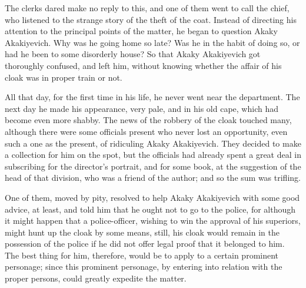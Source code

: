 The clerks dared make no reply to this, and one of them went to call
the chief, who listened to the strange story of the theft of the coat.
Instead of directing his attention to the principal points of the
matter, he began to question Akaky Akakiyevich. Why was he going home
so late? Was he in the habit of doing so, or had he been to some
disorderly house? So that Akaky Akakiyevich got thoroughly confused,
and left him, without knowing whether the affair of his cloak was in
proper train or not.

All that day, for the first time in his life, he never went near the
department. The next day he made his appearance, very pale, and in his
old cape, which had become even more shabby. The news of the robbery
of the cloak touched many, although there were some officials present
who never lost an opportunity, even such a one as the present, of
ridiculing Akaky Akakiyevich. They decided to make a collection for
him on the spot, but the officials had already spent a great deal in
subscribing for the director's portrait, and for some book, at the
suggestion of the head of that division, who was a friend of the
author; and so the sum was trifling.

One of them, moved by pity, resolved to help Akaky Akakiyevich with
some good advice, at least, and told him that he ought not to go to
the police, for although it might happen that a police-officer,
wishing to win the approval of his superiors, might hunt up the cloak
by some means, still, his cloak would remain in the possession of the
police if he did not offer legal proof that it belonged to him. The
best thing for him, therefore, would be to apply to a certain
prominent personage; since this prominent personage, by entering into
relation with the proper persons, could greatly expedite the matter.

